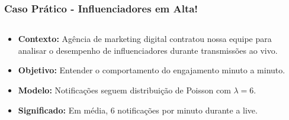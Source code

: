 \documentclass[aspectratio=169,12pt]{beamer}
\begin{document}
\begin{frame}
    \frametitle{Caso Prático - Influenciadores em Alta!}
    
    \begin{columns}
        \begin{column}{0.55\textwidth}
            \begin{itemize}
                \item[\faIcon{briefcase}] \textcolor{azulprincipal}{\textbf{Contexto:}} Agência de marketing digital contratou nossa equipe para analisar o desempenho de influenciadores durante transmissões ao vivo.
                \vspace{0.3cm}
                
                \item[\faIcon{chart-line}] \textcolor{azulprincipal}{\textbf{Objetivo:}} Entender o comportamento do engajamento minuto a minuto.
                \vspace{0.3cm}
                
                \item[\faIcon{random}] \textcolor{azulprincipal}{\textbf{Modelo:}} Notificações seguem distribuição de Poisson com $\lambda = 6$.
                \vspace{0.3cm}
                
                \item[\faIcon{info-circle}] \textcolor{azulprincipal}{\textbf{Significado:}} Em média, 6 notificações por minuto durante a live.
            \end{itemize}
        \end{column}
        
        \begin{column}{0.45\textwidth}
            \begin{center}
                

\end{center}
\end{column}
\end{columns}
\end{frame}
\end{document}
